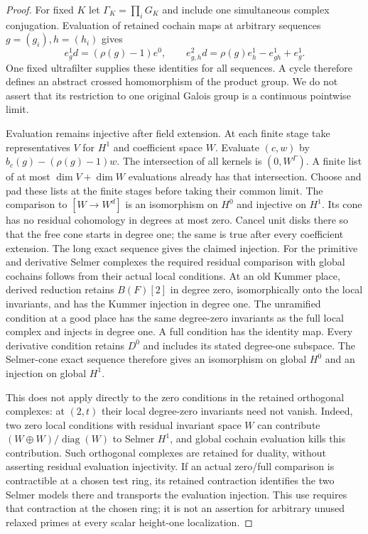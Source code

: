 \documentclass[11pt]{article}
\theoremstyle{definition}
\theoremstyle{remark}
\begin{document}
\begin{proof}\leavevmode
For fixed $K$ let $\Gamma_K=\prod_iG_K$ and include one simultaneous
complex conjugation. Evaluation of retained cochain maps at arbitrary
sequences $g=(g_i),h=(h_i)$ gives
\[
 e^1_gd=(\rho(g)-1)e^0,\qquad
 e^2_{g,h}d=\rho(g)e^1_h-e^1_{gh}+e^1_g.                          \tag{5.2}
\]
One fixed ultrafilter supplies these identities for all sequences.
A cycle therefore defines an abstract crossed homomorphism of the
product group. We do not assert that its restriction to one original
Galois group is a continuous pointwise limit.

Evaluation remains injective after field extension. At each finite
stage take representatives $V$ for $H^1$ and coefficient space $W$. Evaluate
$(c,w)$ by $b_c(g)-(\rho(g)-1)w$. The intersection of all kernels is
$(0,W^\Gamma)$. A finite list of at most $\dim V+\dim W$ evaluations
already has that intersection. Choose and pad these lists at the finite stages before taking their common limit. The comparison to $[W\to W^d]$ is an
isomorphism on $H^0$ and injective on $H^1$. Its cone has no residual
cohomology in degrees at most zero. Cancel unit disks there so that
the free cone starts in degree one; the same is true after every
coefficient extension. The long exact sequence gives the claimed
injection. For the primitive and derivative Selmer complexes the required
residual comparison with global cochains follows from their actual
local conditions. At an old Kummer place, derived reduction retains
$B(F)[2]$ in degree zero, isomorphically onto the local invariants,
and has the Kummer injection in degree one. The unramified condition
at a good place has the same degree-zero invariants as the full local
complex and injects in degree one. A full condition has the identity
map. Every derivative condition retains $D^0$ and includes its stated
degree-one subspace. The Selmer-cone exact sequence therefore gives
an isomorphism on global $H^0$ and an injection on global $H^1$.

This does not apply directly to the zero conditions in the retained
orthogonal complexes: at $(2,t)$ their local degree-zero invariants
need not vanish. Indeed, two zero local conditions with residual
invariant space $W$ can contribute
$(W\oplus W)/\operatorname{diag}(W)$ to Selmer $H^1$, and global
cochain evaluation kills this contribution. Such orthogonal complexes
are retained for duality, without asserting residual evaluation
injectivity. If an actual zero/full comparison is contractible at a
chosen test ring, its retained contraction identifies the two Selmer
models there and transports the evaluation injection. This use requires
that contraction at the chosen ring; it is not an assertion for arbitrary
unused relaxed primes at every scalar height-one localization.


\end{proof}
\end{document}

